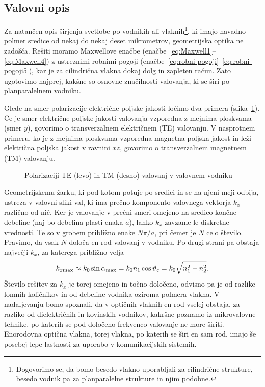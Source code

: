 \subsection*{Valovni opis}
Za natančen opis širjenja svetlobe po vodnikih ali vlaknih\footnote{Dogovorimo se, da bomo 
besedo vlakno uporabljali za cilindrične strukture, besedo vodnik pa za planparalelne 
strukture in njim podobne.}, ki imajo navadno polmer
sredice od nekaj do nekaj deset mikrometrov, geometrijska optika ne
zadošča. Rešiti moramo Maxwellove enačbe (enačbe~\ref{eq:Maxwell1}--\ref{eq:Maxwell4}) 
z ustreznimi robnimi pogoji (enačbe~\ref{eq:robni-pogoji}--\ref{eq:robni-pogoji5}),
kar je za cilindrična vlakna dokaj dolg in zapleten račun. Zato ugotovimo najprej, kakšne
so osnovne značilnosti valovanja, ki se širi po planparalelnem vodniku.

Glede na smer polarizacije električne poljske jakosti 
ločimo dva primera (slika~\ref{fig:TETM}). Če je smer električne poljske
jakosti valovanja vzporedna z mejnima ploskvama (smer $y$), 
govorimo o transverzalnem električnem (TE) valovanju. 
V nasprotnem primeru, ko je 
z mejnima ploskvama vzporedna magnetna poljska jakost in 
leži električna poljska jakost v ravnini $xz$, 
govorimo o transverzalnem magnetnem (TM) valovanju.
\begin{figure}[h]
\centering
\def\svgwidth{140truemm} 

\caption{Polarizaciji TE (levo) in TM (desno) valovanj v valovnem vodniku}
\label{fig:TETM}
\end{figure}

Geometrijskemu žarku, ki pod kotom potuje po sredici in se na njeni meji
odbija, ustreza v valovni sliki val, ki ima prečno komponento valovnega
vektorja $k_{x}$ različno od nič. Ker je valovanje v prečni smeri 
omejeno na sredico končne debeline (naj bo debelina plasti enaka $a$), lahko
$k_{x}$ zavzame le diskretne vrednosti. Te so v grobem približno enake $N\pi/a$, pri čemer je $N$
celo število. Pravimo, da vsak $N$ določa en rod valovanj v vodniku. Po drugi strani 
pa obstaja največji $k_x$, za katerega približno velja
\begin{equation}
k_{x \mathrm{max}} \approx k_0 \sin\alpha_{\rm max} = 
k_0 n_1 \cos\vartheta_c = k_0 \sqrt{n_1^2 -n_2^2}.
\end{equation}
Število rešitev za $k_x$ je torej omejeno in točno določeno, odvisno
pa je od razlike lomnih količnikov in od debeline vodnika oziroma polmera vlakna. 
V nadaljevanju bomo spoznali, da v optičnih vlaknih en rod vselej obstaja,
za razliko od dielektričnih in kovinskih vodnikov, kakršne
poznamo iz mikrovalovne tehnike, po katerih se pod določeno frekvenco
valovanje ne more širiti. Enorodovna optična vlakna, torej vlakna, po katerih se širi
en sam rod, imajo še posebej lepe lastnosti za uporabo v komunikacijskih
sistemih.

